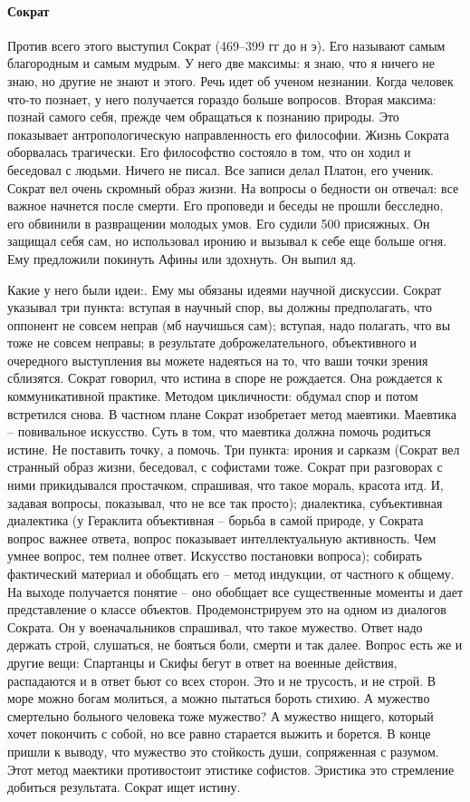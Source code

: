 \documentclass[a4paper, 12pt]{article}
\begin{document}
\paragraph{Сократ} Против всего этого выступил Сократ (469--399 гг до н э). Его называют самым благородным и самым мудрым. У него две максимы: я знаю, что я ничего не знаю, но другие не знают и этого. Речь идет об ученом незнании. Когда человек что-то познает, у него получается гораздо больше вопросов. Вторая максима: познай самого себя, прежде чем обращаться к познанию природы. Это показывает антропологическую направленность его философии. Жизнь Сократа оборвалась трагически. Его философство состояло в том, что он ходил и беседовал с людьми. Ничего не писал. Все записи делал Платон, его ученик. Сократ вел очень скромный образ жизни. На вопросы о бедности он отвечал: все важное начнется после смерти. Его проповеди и беседы не прошли бесследно, его обвинили в развращении молодых умов. Его судили 500 присяжных. Он защищал себя сам, но использовал иронию и вызывал к себе еще больше огня. Ему предложили покинуть Афины или здохнуть. Он выпил яд. 

Какие у него были идеи:. Ему мы обязаны идеями научной дискуссии. Сократ указывал три пункта: вступая в научный спор, вы должны предполагать, что оппонент не совсем неправ (мб научишься сам); вступая, надо полагать, что вы тоже не совсем неправы; в результате доброжелательного, объективного и очередного выступления вы можете надеяться на то, что ваши точки зрения сблизятся. Сократ говорил, что истина в споре не рождается. Она рождается к коммуникативной практике. Методом цикличности: обдумал спор и потом встретился снова. В частном плане Сократ изобретает метод маевтики. Маевтика -- повивальное искусство. Суть в том, что маевтика должна помочь родиться истине. Не поставить точку, а помочь. Три пункта: ирония и сарказм (Сократ вел странный образ жизни, беседовал, с софистами тоже. Сократ при разговорах с ними прикидывался простачком, спрашивая, что такое мораль, красота итд. И, задавая вопросы, показывал, что не все так просто); диалектика, субъективная диалектика (у Гераклита объективная -- борьба в самой природе, у Сократа вопрос важнее ответа, вопрос показывает интеллектуальную активность. Чем умнее вопрос, тем полнее ответ. Искусство постановки вопроса); собирать фактический материал и обобщать его -- метод индукции, от частного к общему. На выходе получается понятие -- оно обобщает все существенные моменты и дает представление о классе объектов. Продемонстрируем это на одном из диалогов Сократа. Он у военачальников спрашивал, что такое мужество. Ответ надо держать строй, слушаться, не бояться боли, смерти и так далее. Вопрос есть же и другие вещи: Спартанцы и Скифы бегут в ответ на военные действия, распадаются и в ответ бьют со всех сторон. Это и не трусость, и не строй. В море можно богам молиться, а можно пытаться бороть стихию. А мужество смертельно больного человека тоже мужество? А мужество нищего, который хочет покончить с собой, но все равно старается выжить и борется. В конце пришли к выводу, что мужество это стойкость души, сопряженная с разумом. Этот метод маектики противостоит этистике софистов. Эристика это стремление добиться результата. Сократ ищет истину. 
\end{document}
